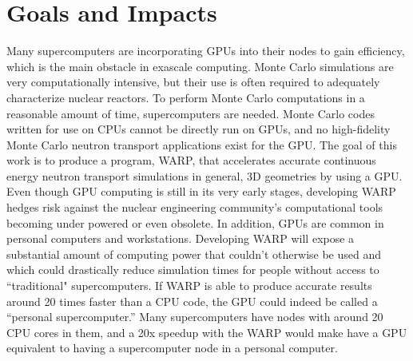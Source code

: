 \section{Goals and Impacts}

Many supercomputers are incorporating GPUs into their nodes to gain efficiency, which is the main obstacle in exascale computing.  Monte Carlo simulations are very computationally intensive, but their use is often required to adequately characterize nuclear reactors.  To perform Monte Carlo computations in a reasonable amount of time, supercomputers are needed.  Monte Carlo codes written for use on CPUs cannot be directly run on GPUs, and no high-fidelity Monte Carlo neutron transport applications exist for the GPU.   The goal of this work is to produce a program, WARP, that accelerates accurate continuous energy neutron transport simulations in general, 3D geometries by using a GPU.  Even though GPU computing is still in its very early stages, developing WARP hedges risk against the nuclear engineering community's computational tools becoming under powered or even obsolete. In addition, GPUs are common in personal computers and workstations.  Developing WARP will expose a substantial amount of  computing power that couldn't otherwise be used and which could drastically reduce simulation times for people without access to ``traditional" supercomputers.  If WARP is able to produce accurate results around 20 times faster than a CPU code, the GPU could indeed be called a ``personal supercomputer.''   Many supercomputers have nodes with around 20 CPU cores in them, and a 20x speedup with the WARP would make have a GPU equivalent to having a supercomputer node in a personal computer.

